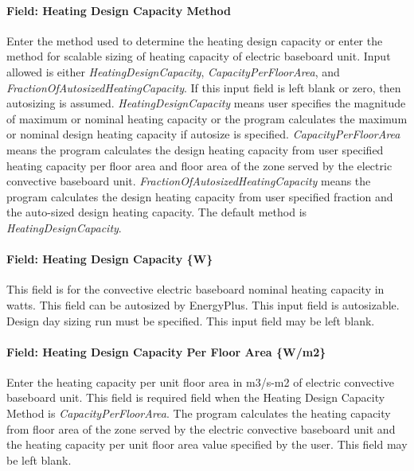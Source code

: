 \paragraph{Field: Heating Design Capacity Method}\label{field-heating-design-capacity-method-4}

Enter the method used to determine the heating design capacity or enter the method for scalable sizing of heating capacity of electric baseboard unit. Input allowed is either \emph{HeatingDesignCapacity}, \emph{CapacityPerFloorArea}, and \emph{FractionOfAutosizedHeatingCapacity}. If this input field is left blank or zero, then autosizing is assumed. \emph{HeatingDesignCapacity} means user specifies the magnitude of maximum or nominal heating capacity or the program calculates the maximum or nominal design heating capacity if autosize is specified. \emph{CapacityPerFloorArea} means the program calculates the design heating capacity from user specified heating capacity per floor area and floor area of the zone served by the electric convective baseboard unit. \emph{FractionOfAutosizedHeatingCapacity} means the program calculates the design heating capacity from user specified fraction and the auto-sized design heating capacity. The default method is \emph{HeatingDesignCapacity}.

\paragraph{Field: Heating Design Capacity \{W\}}\label{field-heating-design-capacity-w-4}

This field is for the convective electric baseboard nominal heating capacity in watts. This field can be autosized by EnergyPlus. This input field is autosizable. Design day sizing run must be specified. This input field may be left blank.

\paragraph{Field: Heating Design Capacity Per Floor Area \{W/m2\}}\label{field-heating-design-capacity-per-floor-area-wm2-4}

Enter the heating capacity per unit floor area in m3/s-m2 of electric convective baseboard unit. This field is required field when the Heating Design Capacity Method is \emph{CapacityPerFloorArea}. The program calculates the heating capacity from floor area of the zone served by the electric convective baseboard unit and the heating capacity per unit floor area value specified by the user. This field may be left blank.

